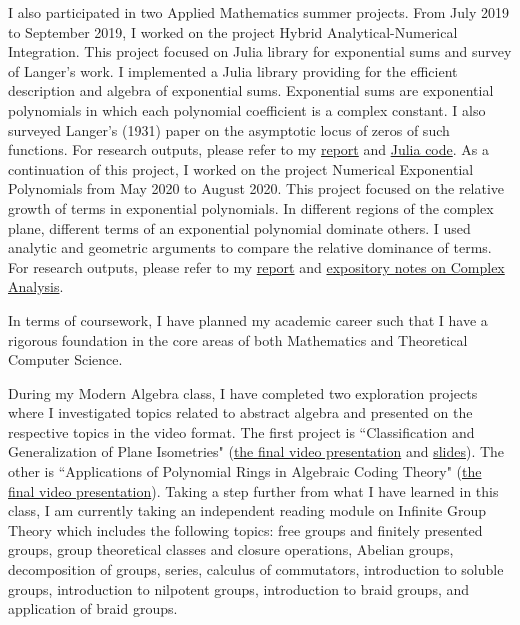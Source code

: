 \documentclass[11pt,reqno,oneside,a4paper]{article}
\begin{document}
	I also participated in two Applied Mathematics summer projects. From July 2019 to September 2019, I worked on the project Hybrid Analytical-Numerical Integration. This project focused on Julia library for exponential sums and survey of Langer's work. I implemented a Julia library providing for the efficient description and algebra of exponential sums. Exponential sums are exponential polynomials in which each polynomial coefficient is a complex constant. I also surveyed Langer's (1931) paper on the asymptotic locus of zeros of such functions. For research outputs, please refer to my \href{https://www.unifiedtransformlab.com/outputs.html#Zha2019a}{report} and \href{https://www.unifiedtransformlab.com/outputs.html#Zha2019b}{Julia code}. As a continuation of this project, I worked on the project Numerical Exponential Polynomials from May 2020 to August 2020. This project focused on the relative growth of terms in exponential polynomials. In different regions of the complex plane, different terms of an exponential polynomial dominate others. I used analytic and geometric arguments to compare the relative dominance of terms. For research outputs, please refer to my \href{https://github.com/zhangliu6/pdfs/blob/master/rank-terms-liu.pdf}{report} and  \href{https://github.com/zhangliu6/pdfs/blob/master/notes-on-complex-analysis-liu.pdf}{expository notes on Complex Analysis}. 
	
	
	In terms of coursework, I have planned my academic career such that I have a rigorous foundation in  the core areas of both Mathematics and Theoretical Computer Science. 
	
	During my Modern Algebra class,  I have completed two exploration projects where I investigated topics related to abstract algebra and presented on the respective topics in the video format. The first project is ``Classification and Generalization of Plane Isometries" (\href{https://youtu.be/63exo4bGD7k}{the final video presentation} and \href{https://github.com/zhangliu6/course-submissions/blob/main/Modern_Algebra_Exploration_1%20(1).pdf}{slides}). The other is ``Applications of Polynomial Rings in Algebraic Coding Theory" (\href{https://youtu.be/_XOCvLLPfVQ}{the final video presentation}). Taking a step further from what I have learned in this class, I am currently taking an independent reading module on Infinite Group Theory which includes the following topics: free groups and finitely presented groups, group theoretical classes and closure operations, Abelian groups, decomposition of groups, series, calculus of commutators, introduction to soluble groups, introduction to nilpotent groups, introduction to braid groups, and application of braid groups. 
		
\end{document}
